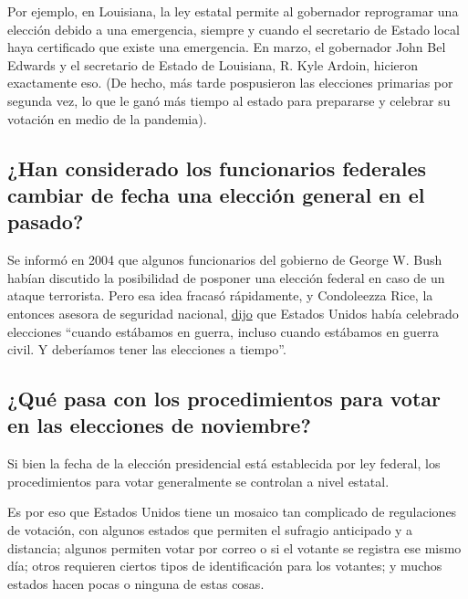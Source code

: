 Por ejemplo, en Louisiana, la ley estatal permite al gobernador
reprogramar una elección debido a una emergencia, siempre y cuando el
secretario de Estado local haya certificado que existe una emergencia.
En marzo, el gobernador John Bel Edwards y el secretario de Estado de
Louisiana, R. Kyle Ardoin, hicieron exactamente eso. (De hecho, más
tarde pospusieron las elecciones primarias por segunda vez, lo que le
ganó más tiempo al estado para prepararse y celebrar su votación en
medio de la pandemia).

\hypertarget{han-considerado-los-funcionarios-federales-cambiar-de-fecha-una-elecciuxf3n-general-en-el-pasado}{%
\subsection{¿Han considerado los funcionarios federales cambiar de fecha
una elección general en el
pasado?}\label{han-considerado-los-funcionarios-federales-cambiar-de-fecha-una-elecciuxf3n-general-en-el-pasado}}

Se informó en 2004 que algunos funcionarios del gobierno de George W.
Bush habían discutido la posibilidad de posponer una elección federal en
caso de un ataque terrorista. Pero esa idea fracasó rápidamente, y
Condoleezza Rice, la entonces asesora de seguridad nacional,
\href{https://www.nytimes3xbfgragh.onion/2004/07/13/trail/trail/white-house-tries-to-calm-hubbub-over-vote-delay.html}{dijo}
que Estados Unidos había celebrado elecciones ``cuando estábamos en
guerra, incluso cuando estábamos en guerra civil. Y deberíamos tener las
elecciones a tiempo''.

\hypertarget{quuxe9-pasa-con-los-procedimientos-para-votar-en-las-elecciones-de-noviembre}{%
\subsection{¿Qué pasa con los procedimientos para votar en las
elecciones de
noviembre?}\label{quuxe9-pasa-con-los-procedimientos-para-votar-en-las-elecciones-de-noviembre}}

Si bien la fecha de la elección presidencial está establecida por ley
federal, los procedimientos para votar generalmente se controlan a nivel
estatal.

Es por eso que Estados Unidos tiene un mosaico tan complicado de
regulaciones de votación, con algunos estados que permiten el sufragio
anticipado y a distancia; algunos permiten votar por correo o si el
votante se registra ese mismo día; otros requieren ciertos tipos de
identificación para los votantes; y muchos estados hacen pocas o ninguna
de estas cosas.

